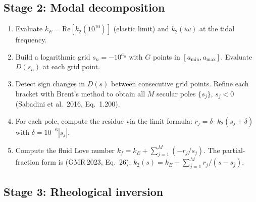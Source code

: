 \documentclass[11pt]{article}
\begin{document}
\subsection*{Stage 2: Modal decomposition}

\begin{enumerate}[leftmargin=2em, resume]
  \item Evaluate $k_E = \mathrm{Re}[k_2(10^{10})]$ (elastic limit)
    and $k_2(i\omega)$ at the tidal frequency.

  \item Build a logarithmic grid $s_n = -10^{a_n}$ with $G$ points
    in $[a_{\min}, a_{\max}]$.  Evaluate $D(s_n)$ at each grid point.

  \item Detect sign changes in $D(s)$ between
    consecutive grid points.  Refine each bracket with Brent's method
    to obtain all $M$ secular poles $\{s_j\}$, $s_j < 0$
    (Sabadini et al.\ 2016, Eq.~1.200).

  \item For each pole, compute the residue via the limit formula:
    $r_j = \delta \cdot k_2(s_j + \delta)$ with
    $\delta = 10^{-6}|s_j|$.

  \item Compute the fluid Love number
    $k_f = k_E + \sum_{j=1}^{M}(-r_j / s_j)$.
    The partial-fraction form is
    (GMR\,2023, Eq.~26):
    $k_2(s) = k_E + \sum_{j=1}^{M} r_j/(s - s_j)$.
\end{enumerate}

\subsection*{Stage 3: Rheological inversion}
\end{document}
